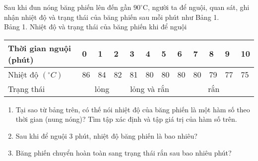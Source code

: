 \begin{ex}%
 Sau khi đun nóng băng phiến lên đến gần $90^{\circ} \mathrm{C}$, người ta để nguội, quan sát, ghi nhận nhiệt độ và trạng thái của băng phiến sau mỗi phút như Bảng 1.\\
Bảng 1. Nhiệt độ và trạng thái của băng phiến khi để nguội
\begin{center}
\begin{tabular}{|l|l|l|l|l|l|l|l|l|l|l|l|}
    \hline Thời gian nguội (phút)& 0 & 1 & 2 & 3 & 4 & 5 & 6 & 7 & 8 & 9 & 10 \\
    \hline Nhiệt độ $\left({ }^{\circ} C\right)$ & 86 & 84 & 82 & 81 & 80 & 80 & 80 & 80 & 79 & 77 & 75 \\
    \hline Trạng thái & \multicolumn{3}{c|}{ lỏng } & \multicolumn{3}{c|}{ lỏng và rắn } & \multicolumn{5}{c|}{ rắn } \\
    \hline
\end{tabular}
\end{center}
\begin{enumerate}
\item Tại sao từ bảng trên, có thế nói nhiệt độ của băng phiến là một hàm số theo thời gian (nung nóng)? Tìm tập xác định và tập giá trị của hàm số trên.
\item Sau khi để nguội 3 phút, nhiệt độ băng phiến là bao nhiêu?
\item Băng phiến chuyển hoàn toàn sang trạng thái rắn sau bao nhiêu phút?
\end{enumerate}
\end{ex}

